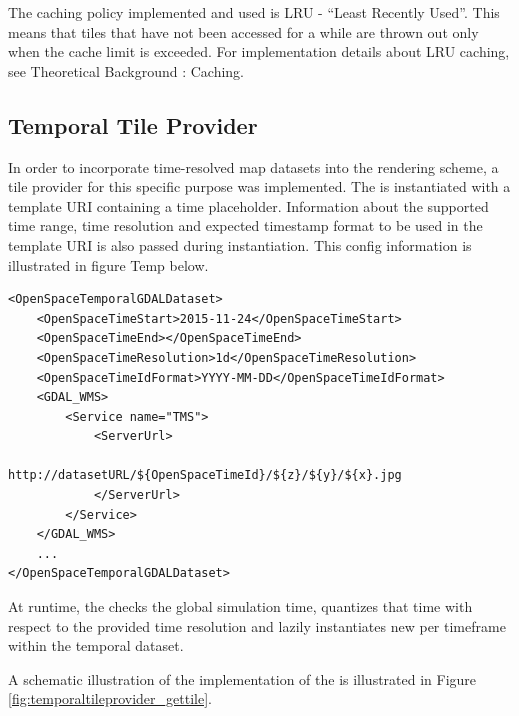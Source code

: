 The caching policy implemented and used is LRU - ``Least Recently Used''. This means that tiles that have not been accessed for a while are thrown out only when the cache limit is exceeded. For implementation details about LRU caching, see Theoretical Background : Caching. 

\subsection{Temporal Tile Provider}
In order to incorporate time-resolved map datasets into the rendering scheme, a tile provider for this specific purpose was implemented. The  is instantiated with a template URI containing a time placeholder. Information about the supported time range, time resolution and expected timestamp format to be used in the template URI is also passed during instantiation. This config information is illustrated in figure Temp below. 

\begin{verbatim}
<OpenSpaceTemporalGDALDataset>
    <OpenSpaceTimeStart>2015-11-24</OpenSpaceTimeStart>
    <OpenSpaceTimeEnd></OpenSpaceTimeEnd>
    <OpenSpaceTimeResolution>1d</OpenSpaceTimeResolution>
    <OpenSpaceTimeIdFormat>YYYY-MM-DD</OpenSpaceTimeIdFormat>
    <GDAL_WMS>
        <Service name="TMS">
            <ServerUrl>
                http://datasetURL/${OpenSpaceTimeId}/${z}/${y}/${x}.jpg 
            </ServerUrl>
        </Service>
    </GDAL_WMS>
    ...
</OpenSpaceTemporalGDALDataset>
\end{verbatim}

At runtime, the  checks the global simulation time, quantizes that time with respect to the provided time resolution and lazily instantiates new  per timeframe within the temporal dataset. 

A schematic illustration of the implementation of the  is illustrated in Figure \ref{fig:temporaltileprovider_gettile}.

